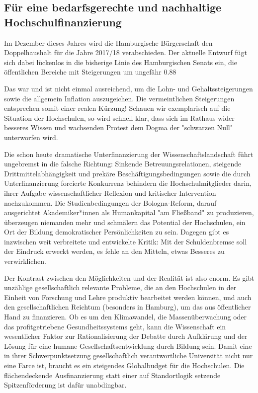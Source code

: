 \documentclass[ngerman,headheight=70pt]{scrartcl}
\begin{document}
    \newpage

    \subsection*{Für eine bedarfsgerechte und nachhaltige Hochschulfinanzierung}

    Im Dezember dieses Jahres wird die Hamburgische Bürgerschaft den Doppelhaushalt für die Jahre 2017/18 verabschieden. Der aktuelle Entwurf fügt sich dabei lückenlos in die bisherige Linie des Hamburgischen Senats ein, die öffentlichen Bereiche mit Steigerungen um ungefähr 0.88%

    Das war und ist nicht einmal ausreichend, um die Lohn- und Gehaltssteigerungen
    sowie die allgemein Inflation auszugeichen. Die vermeintlichen Steigerungen
    entsprechen somit einer realen Kürzung! Schauen wir exemplarisch auf die
    Situation der Hochschulen, so wird schnell klar, dass sich im Rathaus wider
    besseres Wissen und wachsenden Protest dem Dogma der "schwarzen Null"
    unterworfen wird.

    Die schon heute dramatische Unterfinanzierung der Wissenschaftslandschaft
    führt ungebremst in die falsche Richtung: Sinkende Betreuungsrelationen,
    steigende Drittmittelabhängigkeit und prekäre Beschäftigungsbedingungen sowie
    die durch Unterfinanzierung forcierte Konkurrenz behindern die
    Hochschulmitglieder darin, ihrer Aufgabe wissenschaftlicher Reflexion und
    kritischer Intervention nachzukommen. Die Studienbedingungen der Bologna-Reform,
    darauf ausgerichtet Akademiker*innen als Humankapital "am Fließband" zu
    produzieren, überzeugen niemanden mehr und schmälern das Potential der
    Hochschulen, ein Ort der Bildung demokratischer Persönlichkeiten zu sein.
    Dagegen gibt es inzwischen weit verbreitete und entwickelte Kritik: Mit der
    Schuldenbremse soll der Eindruck erweckt werden, es fehle an den Mitteln,
    etwas Besseres zu verwirklichen.

    Der Kontrast zwischen den Möglichkeiten und der Realität ist also enorm. Es
    gibt unzählige gesellschaftlich relevante Probleme, die an den Hochschulen
    in der Einheit von Forschung und Lehre produktiv bearbeitet werden können,
    und auch den gesellschaftlichen Reichtum (besonders in Hamburg), um das aus
    öffentlicher Hand zu finanzieren. Ob es um den Klimawandel, die
    Massenüberwachung oder das profitgetriebene Gesundheitssystems geht, kann die
    Wissenschaft ein wesentlicher Faktor zur Rationalisierung der Debatte durch
    Aufklärung und der Lösung für eine humane Gesellschaftsentwicklung durch
    Bildung sein. Damit eine in ihrer Schwerpunktsetzung gesellschaftlich
    verantwortliche Universität nicht nur eine Farce ist, braucht es ein steigendes
    Globalbudget für die Hochschulen. Die flächendeckende Ausfinanzierung statt
    einer auf Standortlogik setzende Spitzenförderung ist dafür unabdingbar.
\end{document}
